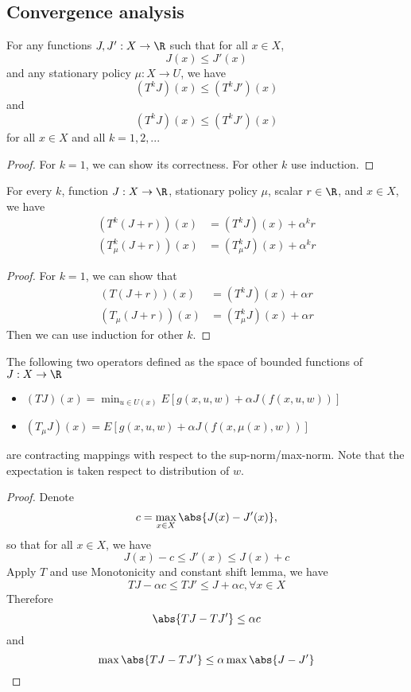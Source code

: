 \begin{refsection}
\subsection{Convergence analysis}

\begin{lemma}\cite[9]{bertsekas2012dynamic2}
For any functions $J,J':X\to \R$ such that for all $x\in X$,
$$J(x) \leq J'(x)$$ 
and any stationary policy $\mu:X\to U$, we have
$$(T^kJ)(x) \leq (T^kJ')(x)$$
and
$$(T^kJ)(x) \leq (T^kJ')(x)$$
for all $x\in X$ and all $k=1,2,...$
\end{lemma}
\begin{proof}
For $k=1$, we can show its correctness. For other $k$ use induction.
\end{proof}


\begin{lemma}\cite[9]{bertsekas2012dynamic2}
For every $k$, function $J:X\to \R$, stationary policy $\mu$, scalar $r\in \R$, and $x\in X$, we have
\begin{align*}
(T^k(J+r))(x) &= (T^kJ)(x) + \alpha^k r\\
(T^k_\mu(J+r))(x) &= (T^k_\mu J)(x) + \alpha^k r
\end{align*}
\end{lemma}
\begin{proof}
For $k=1$, we can show that 
\begin{align*}
(T(J+r))(x) &= (T^kJ)(x) + \alpha r\\
(T_\mu(J+r))(x) &= (T^k_\mu J)(x) + \alpha r
\end{align*}
Then we can use induction for other $k$.
\end{proof}



\begin{theorem}\cite[18]{bertsekas2012dynamic}\label{ch:stochastic-optimal-control:dynamicprogrammingcontracting}
	The following two operators defined as the space of bounded functions of $J:X\to \R$
	\begin{itemize}
	\item $(TJ)(x) = \min_{u\in U(x)} E[g(x,u,w) + \alpha J(f(x,u,w))]$
	\item $(T_\mu J)(x) =  E[g(x,u,w) + \alpha J(f(x,\mu(x),w))]$	
	\end{itemize}
	are	contracting mappings with respect to the sup-norm/max-norm. Note that the expectation is taken respect to distribution of $w$.
\end{theorem}
\begin{proof}
Denote $$c = \max_{x\in X}\abs{J(x) - J'(x)},$$
so that for all $x\in X$, we have
$$J(x) - c \leq J'(x) \leq J(x) + c$$
Apply $T$ and use Monotonicity and constant shift lemma, we have
$$TJ - \alpha c \leq TJ' \leq J +\alpha c, \forall x\in X$$
Therefore
$$\abs{TJ - TJ'} \leq \alpha c$$
and 
$$\max \abs{TJ - TJ'} \leq \alpha \max \abs{J - J'}$$
\end{proof}


\end{refsection}
